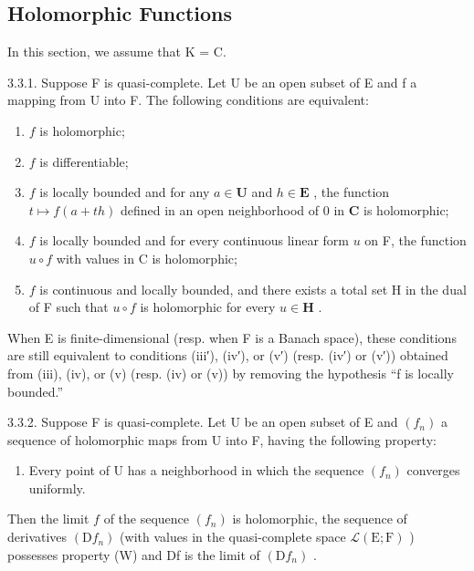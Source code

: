 \subsection{Holomorphic Functions}

In this section, we assume that K = C.

3.3.1. Suppose F is quasi-complete. Let U be an open subset of E and f a mapping from U into F. The following conditions are equivalent:

\begin{enumerate}
\def\labelenumi{(\roman{enumi})}
\item
  \(f\) is holomorphic;
\item
  \(f\) is differentiable;
\item
  \(f\) is locally bounded and for any \(a \in \mathbf{U}\) and \(h \in \mathbf{E}\) , the function \(t \mapsto f(a + th)\) defined in an open neighborhood of 0 in \(\mathbf{C}\) is holomorphic;
\item
  \(f\) is locally bounded and for every continuous linear form \(u\) on F, the function \(u \circ f\) with values in C is holomorphic;
\item
  \(f\) is continuous and locally bounded, and there exists a total set H in the dual of F such that \(u \circ f\) is holomorphic for every \(u \in \mathbf{H}\) .
\end{enumerate}

When E is finite-dimensional (resp. when F is a Banach space), these conditions are still equivalent to conditions (iii′), (iv′), or (v′) (resp. (iv′) or (v′)) obtained from (iii), (iv), or (v) (resp. (iv) or (v)) by removing the hypothesis “f is locally bounded.”

3.3.2. Suppose F is quasi-complete. Let U be an open subset of E and \((f_{n})\) a sequence of holomorphic maps from U into F, having the following property:

\begin{enumerate}
\def\labelenumi{(\Alph{enumi})}
\setcounter{enumi}{22}
\tightlist
\item
  Every point of U has a neighborhood in which the sequence \((f_{n})\) converges uniformly.
\end{enumerate}

Then the limit \(f\) of the sequence \((f_{n})\) is holomorphic, the sequence of derivatives \((\mathrm{D}f_{n})\) (with values in the quasi-complete space \(\mathcal{L}(\mathrm{E};\mathrm{F})\) ) possesses property (W) and Df is the limit of \((\mathrm{D}f_{n})\) .

